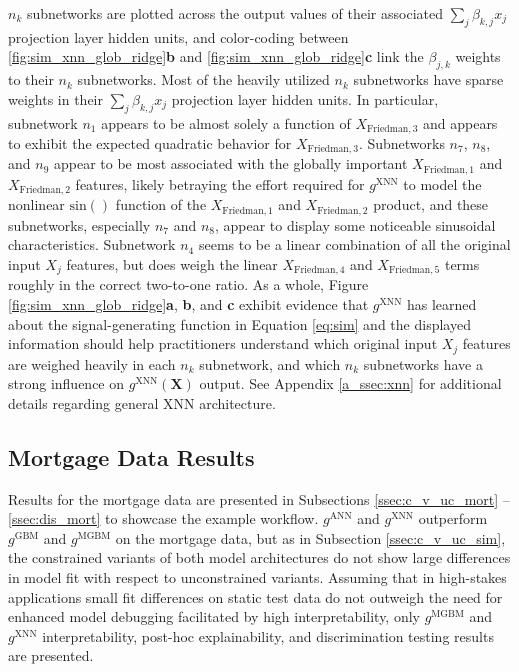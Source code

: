\documentclass[information,article,submit,moreauthors,pdftex]{definitions/mdpi}
\begin{document}
\noindent $n_k$ subnetworks are plotted across the output values of their associated $\sum_j\beta_{k,j}x_j$ projection layer hidden units, and color-coding between \ref{fig:sim_xnn_glob_ridge}\textbf{b} and \ref{fig:sim_xnn_glob_ridge}\textbf{c} link the $\beta_{j,k}$ weights to their $n_k$ subnetworks. Most of the heavily utilized $n_k$ subnetworks have sparse weights in their $\sum_j\beta_{k,j}x_j$ projection layer hidden units. In particular, subnetwork $n_1$ appears to be almost solely a function of $X_{\text{Friedman}, 3}$ and appears to exhibit the expected quadratic behavior for $X_{\text{Friedman}, 3}$.  Subnetworks $n_7$, $n_8$, and $n_9$ appear to be most associated with the globally important $X_{\text{Friedman}, 1}$ and $X_{\text{Friedman}, 2}$ features, likely betraying the effort required for $g^{\text{XNN}}$ to model the nonlinear $\text{sin}()$ function of the $X_{\text{Friedman}, 1}$ and $X_{\text{Friedman}, 2}$ product, and these subnetworks, especially $n_7$ and $n_8$, appear to display some noticeable sinusoidal characteristics. Subnetwork $n_4$ seems to be a linear combination of all the original input $X_j$ features, but does weigh the linear $X_{\text{Friedman},4}$ and $X_{\text{Friedman},5}$ terms roughly in the correct two-to-one ratio. As a whole, Figure \ref{fig:sim_xnn_glob_ridge}\textbf{a}, \textbf{b}, and \textbf{c} exhibit evidence that $g^\text{XNN}$ has learned about the signal-generating function in Equation \ref{eq:sim} and the displayed information should help practitioners understand which original input $X_j$ features are weighed heavily in each $n_k$ subnetwork, and which $n_k$ subnetworks have a strong influence on $g^\text{XNN}(\mathbf{X})$ output. See Appendix \ref{a_ssec:xnn} for additional details regarding general XNN architecture.

\subsection{Mortgage Data Results}

Results for the mortgage data are presented in Subsections \ref{ssec:c_v_uc_mort} -- \ref{ssec:dis_mort} to showcase the example workflow.  $g^\text{ANN}$ and $g^\text{XNN}$ outperform $g^\text{GBM}$ and $g^\text{MGBM}$ on the mortgage data, but as in Subsection \ref{ssec:c_v_uc_sim}, the constrained variants of both model architectures do not show large differences in model fit with respect to unconstrained variants. Assuming that in high-stakes applications small fit differences on static test data do not outweigh the need for enhanced model debugging facilitated by high interpretability, only $g^\text{MGBM}$ and $g^\text{XNN}$ interpretability, post-hoc explainability, and discrimination testing results are presented. 
\end{document}
